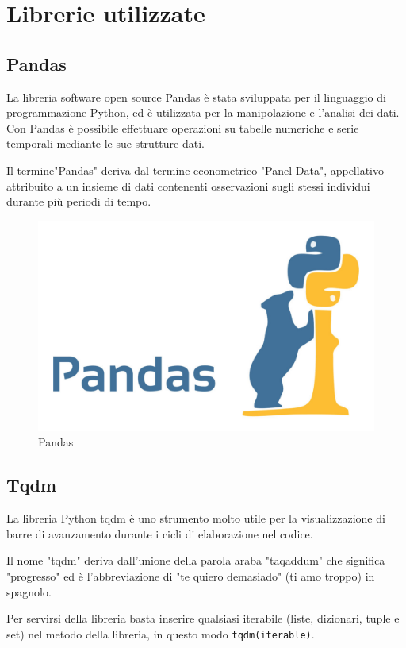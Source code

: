 \section{Librerie utilizzate}
\subsection{Pandas}
La libreria software open source Pandas è stata sviluppata per il linguaggio di programmazione Python, ed è utilizzata per la manipolazione e l'analisi dei dati. Con Pandas è possibile effettuare operazioni su tabelle numeriche e serie temporali mediante le sue strutture dati. 

Il termine"Pandas" deriva dal termine econometrico "Panel Data", appellativo attribuito a un insieme di dati contenenti osservazioni sugli stessi individui durante più periodi di tempo.

\begin{figure}
    \begin{center}    
        \includegraphics[width=0.9\linewidth]{images/image4.jpeg}
        \caption{Pandas}
    \end{center}
\end{figure}

\subsection{Tqdm}
La libreria Python tqdm \cite{Tqdm} è uno strumento molto utile per la visualizzazione di barre di avanzamento durante i cicli di elaborazione nel codice. 

Il nome "tqdm" deriva dall'unione della parola araba "taqaddum" che significa "progresso" ed è l'abbreviazione di "te quiero demasiado" (ti amo troppo) in spagnolo. 

Per servirsi della libreria basta inserire qualsiasi iterabile (liste, dizionari, tuple e set) nel metodo della libreria, in questo modo \texttt{tqdm(iterable)}. 

